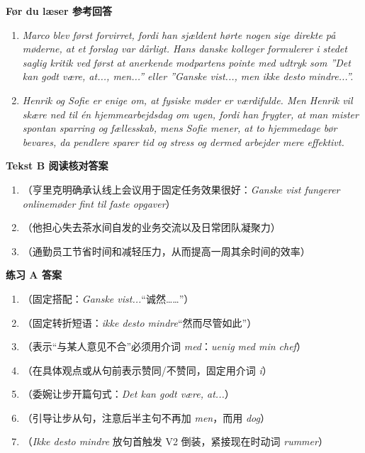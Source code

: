 \begin{answerbox}
\textbf{Før du læser 参考回答}
\begin{enumerate}
  \item \textit{Marco blev først forvirret, fordi han sjældent hørte nogen sige direkte på møderne, at et forslag var dårligt. Hans danske kolleger formulerer i stedet saglig kritik ved først at anerkende modpartens pointe med udtryk som ”Det kan godt være, at..., men...” eller ”Ganske vist..., men ikke desto mindre...”.}
  \item \textit{Henrik og Sofie er enige om, at fysiske møder er værdifulde. Men Henrik vil skære ned til én hjemmearbejdsdag om ugen, fordi han frygter, at man mister spontan sparring og fællesskab, mens Sofie mener, at to hjemmedage bør bevares, da pendlere sparer tid og stress og dermed arbejder mere effektivt.}
\end{enumerate}

\textbf{Tekst B 阅读核对答案}
\begin{enumerate}
  \item {}（亨里克明确承认线上会议用于固定任务效果很好：\textit{Ganske vist fungerer onlinemøder fint til faste opgaver}）
  \item {}（他担心失去茶水间自发的业务交流以及日常团队凝聚力）
  \item {}（通勤员工节省时间和减轻压力，从而提高一周其余时间的效率）
\end{enumerate}

\textbf{练习 A 答案}
\begin{enumerate}
  \item {}（固定搭配：\textit{Ganske vist...}“诚然……”）
  \item {}（固定转折短语：\textit{ikke desto mindre}“然而尽管如此”）
  \item {}（表示“与某人意见不合”必须用介词 \textit{med}：\textit{uenig med min chef}）
  \item {}（在具体观点或从句前表示赞同/不赞同，固定用介词 \textit{i}）
  \item {}（委婉让步开篇句式：\textit{Det kan godt være, at...}）
  \item {}（引导让步从句，注意后半主句不再加 \textit{men}，而用 \textit{dog}）
  \item {}（\textit{Ikke desto mindre} 放句首触发 V2 倒装，紧接现在时动词 \textit{rummer}）
\end{enumerate}


\end{answerbox}
